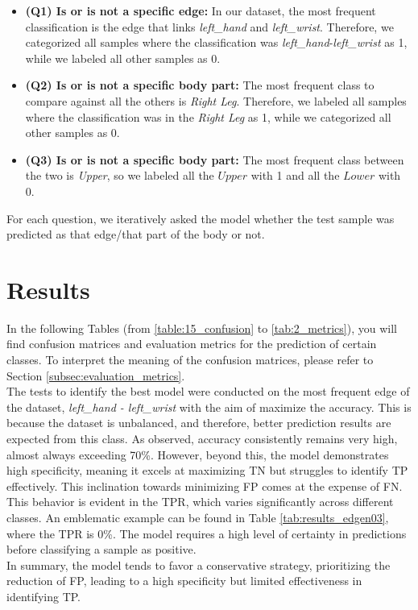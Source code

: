 \begin{itemize}

    \item \textbf{(Q1) Is or is not a specific edge:} In our dataset, the most frequent classification is the edge that links \textit{left\_hand} and \textit{left\_wrist}. 
    Therefore, we categorized all samples where the classification was \textit{left\_hand}-\textit{left\_wrist} as 1, while we labeled all other samples as 0.   
    
    \item \textbf{(Q2) Is or is not a specific body part:} The most frequent class to compare against all the others is \textit{Right Leg}.
    Therefore, we labeled all samples where the classification was in the \textit{Right Leg} as 1, while we categorized all other samples as 0.

    \item \textbf{(Q3) Is or is not a specific body part:} The most frequent class between the two is \textit{Upper}, so we labeled all the $Upper$ with 1 and all the $Lower$ with 0.
    
   
\end{itemize}

For each question, we iteratively asked the model whether the test sample was predicted as that edge/that part of the body or not.

\section{Results}
In the following Tables (from \ref{table:15_confusion} to \ref{tab:2_metrics}), you will find confusion matrices and evaluation metrics for the prediction of certain classes.
To interpret the meaning of the confusion matrices, please refer to Section \ref{subsec:evaluation_metrics}.
\\

The tests to identify the best model were conducted on the most frequent edge of the dataset, \textit{left\_hand - left\_wrist} with the aim of maximize the accuracy.
This is because the dataset is unbalanced, and therefore, better prediction results are expected from this class.
As observed, accuracy consistently remains very high, almost always exceeding 70\%.
However, beyond this, the model demonstrates high specificity, meaning it excels at maximizing TN but struggles to identify TP effectively.
This inclination towards minimizing FP comes at the expense of FN.
This behavior is evident in the TPR, which varies significantly across different classes.
An emblematic example can be found in Table \ref{tab:results_edgen03}, where the TPR is 0\%.
The model requires a high level of certainty in predictions before classifying a sample as positive. \\
In summary, the model tends to favor a conservative strategy, prioritizing the reduction of FP, leading to a high specificity but limited effectiveness in identifying TP.


